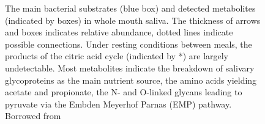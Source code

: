 \begin{tcolorbox}[
    title=Saliva,
    title filled=false,
    colback=blue!5!white,
    colframe=blue!75!black]
\begin{figure}[!ht]
        \caption{The main bacterial substrates (blue box) and detected metabolites (indicated by boxes) in whole mouth saliva. 
        The thickness of arrows and boxes indicates relative abundance, dotted lines indicate possible connections. 
        Under resting conditions between meals, the products of the citric acid cycle (indicated by *) are largely undetectable. 
        Most metabolites indicate the breakdown of salivary glycoproteins as the main nutrient source, the amino acids 
        yielding acetate and propionate, the N- and O-linked glycans leading to pyruvate via the Embden Meyerhof Parnas (EMP) pathway. 
        Borrowed from  \cite{Carperter2020}}
        \label{fig:saliva_content}
    \end{figure}
\end{tcolorbox}